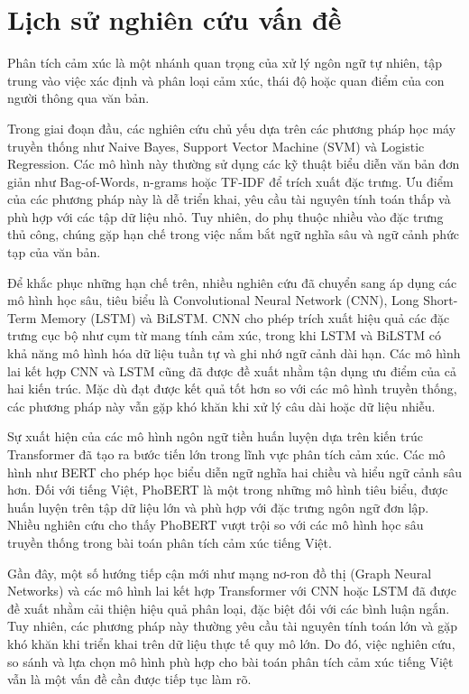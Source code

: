 \documentclass[14pt, a4paper]{report}
\begin{document}
\section{Lịch sử nghiên cứu vấn đề}

Phân tích cảm xúc là một nhánh quan trọng của xử lý ngôn ngữ tự nhiên, tập trung vào việc xác định và phân loại cảm xúc, thái độ hoặc quan điểm của con người thông qua văn bản.

Trong giai đoạn đầu, các nghiên cứu chủ yếu dựa trên các phương pháp học máy truyền thống như Naive Bayes, Support Vector Machine (SVM) và Logistic Regression. Các mô hình này thường sử dụng các kỹ thuật biểu diễn văn bản đơn giản như Bag-of-Words, n-grams hoặc TF-IDF để trích xuất đặc trưng. Ưu điểm của các phương pháp này là dễ triển khai, yêu cầu tài nguyên tính toán thấp và phù hợp với các tập dữ liệu nhỏ. Tuy nhiên, do phụ thuộc nhiều vào đặc trưng thủ công, chúng gặp hạn chế trong việc nắm bắt ngữ nghĩa sâu và ngữ cảnh phức tạp của văn bản.

Để khắc phục những hạn chế trên, nhiều nghiên cứu đã chuyển sang áp dụng các mô hình học sâu, tiêu biểu là Convolutional Neural Network (CNN), Long Short-Term Memory (LSTM) và BiLSTM. CNN cho phép trích xuất hiệu quả các đặc trưng cục bộ như cụm từ mang tính cảm xúc, trong khi LSTM và BiLSTM có khả năng mô hình hóa dữ liệu tuần tự và ghi nhớ ngữ cảnh dài hạn. Các mô hình lai kết hợp CNN và LSTM cũng đã được đề xuất nhằm tận dụng ưu điểm của cả hai kiến trúc. Mặc dù đạt được kết quả tốt hơn so với các mô hình truyền thống, các phương pháp này vẫn gặp khó khăn khi xử lý câu dài hoặc dữ liệu nhiễu.

Sự xuất hiện của các mô hình ngôn ngữ tiền huấn luyện dựa trên kiến trúc Transformer đã tạo ra bước tiến lớn trong lĩnh vực phân tích cảm xúc. Các mô hình như BERT cho phép học biểu diễn ngữ nghĩa hai chiều và hiểu ngữ cảnh sâu hơn. Đối với tiếng Việt, PhoBERT là một trong những mô hình tiêu biểu, được huấn luyện trên tập dữ liệu lớn và phù hợp với đặc trưng ngôn ngữ đơn lập. Nhiều nghiên cứu cho thấy PhoBERT vượt trội so với các mô hình học sâu truyền thống trong bài toán phân tích cảm xúc tiếng Việt.

Gần đây, một số hướng tiếp cận mới như mạng nơ-ron đồ thị (Graph Neural Networks) và các mô hình lai kết hợp Transformer với CNN hoặc LSTM đã được đề xuất nhằm cải thiện hiệu quả phân loại, đặc biệt đối với các bình luận ngắn. Tuy nhiên, các phương pháp này thường yêu cầu tài nguyên tính toán lớn và gặp khó khăn khi triển khai trên dữ liệu thực tế quy mô lớn. Do đó, việc nghiên cứu, so sánh và lựa chọn mô hình phù hợp cho bài toán phân tích cảm xúc tiếng Việt vẫn là một vấn đề cần được tiếp tục làm rõ.
\end{document}

